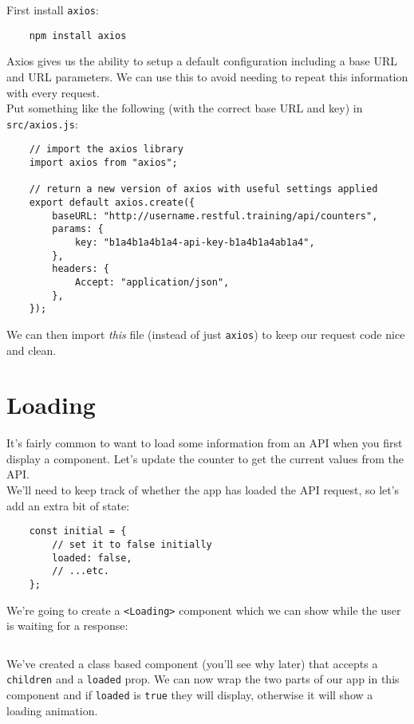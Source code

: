 First install \texttt{axios}:

\begin{verbatim}
    npm install axios
\end{verbatim}

Axios gives us the ability to setup a default configuration including a base URL and URL parameters. We can use this to avoid needing to repeat this information with every request.
\\

Put something like the following (with the correct base URL and key) in \texttt{src/axios.js}:

\begin{verbatim}
    // import the axios library
    import axios from "axios";

    // return a new version of axios with useful settings applied
    export default axios.create({
        baseURL: "http://username.restful.training/api/counters",
        params: {
            key: "b1a4b1a4b1a4-api-key-b1a4b1a4ab1a4",
        },
        headers: {
            Accept: "application/json",
        },
    });
\end{verbatim}

We can then import \textit{this} file (instead of just \texttt{axios}) to keep our request code nice and clean.


\section{Loading}

It's fairly common to want to load some information from an API when you first display a component. Let's update the counter to get the current values from the API.
\\

We'll need to keep track of whether the app has loaded the API request, so let's add an extra bit of state:

\begin{verbatim}
    const initial = {
        // set it to false initially
        loaded: false,
        // ...etc.
    };
\end{verbatim}


We're going to create a \texttt{<Loading>} component which we can show while the user is waiting for a response:

\inputminted{jsx}{04/figures/01-Loading.jsx}

We've created a class based component (you'll see why later) that accepts a \texttt{children} and a \texttt{loaded} prop. We can now wrap the two parts of our app in this component and if \texttt{loaded} is \texttt{true} they will display, otherwise it will show a loading animation.
\\

